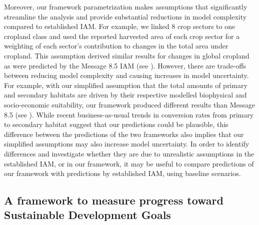 \documentclass[titlesmallcaps,copyrightpage]{uomthesis}\usepackage[]{graphicx}\usepackage[]{color}
\begin{document}
Moreover, our framework parametrization makes assumptions that significantly streamline the analysis and provide substantial reductions in model complexity compared to established IAM. For example, we linked 8 crop sectors to one cropland class and used the reported harvested area of each crop sector for a weighting of each sector's contribution to changes in the total area under cropland. This assumption derived similar results for changes in global cropland as were predicted by the Message 8.5 IAM (see ). However, there are trade-offs between reducing model complexity and causing increases in model uncertainty. For example, with our simplified assumption that the total amounts of primary and secondary habitats are driven by their respective modelled biophysical and socio-economic suitability, our framework produced different results than Message 8.5 (see ). While recent business-as-usual trends in conversion rates from primary to secondary habitat suggest that our predictions could be plausible, this difference between the predictions of the two frameworks also implies that our simplified assumptions may also increase model uncertainty. In order to identify differences and investigate whether they are due to unrealistic assumptions in the established IAM, or in our framework, it may be useful to compare predictions of our framework with predictions by established IAM, using baseline scenarios.

\subsection{A framework to measure progress toward Sustainable Development Goals}
\end{document}
